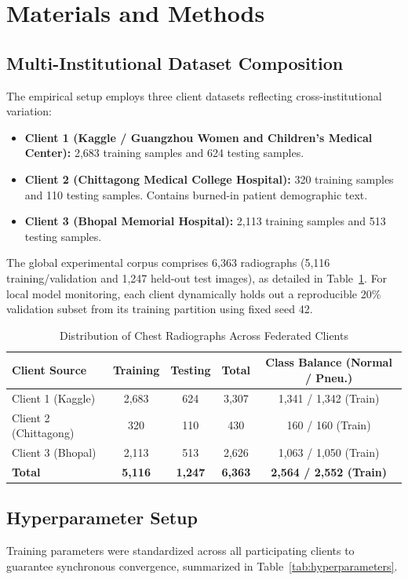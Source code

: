 \documentclass[journal]{IEEEtran}
\begin{document}
\section{Materials and Methods}

\subsection{Multi-Institutional Dataset Composition}
The empirical setup employs three client datasets reflecting cross-institutional variation:
\begin{itemize}
    \item \textbf{Client 1 (Kaggle / Guangzhou Women and Children's Medical Center):} 2,683 training samples and 624 testing samples.
    \item \textbf{Client 2 (Chittagong Medical College Hospital):} 320 training samples and 110 testing samples. Contains burned-in patient demographic text.
    \item \textbf{Client 3 (Bhopal Memorial Hospital):} 2,113 training samples and 513 testing samples.
\end{itemize}
The global experimental corpus comprises 6,363 radiographs (5,116 training/validation and 1,247 held-out test images), as detailed in Table~\ref{tab:dataset_distribution}. For local model monitoring, each client dynamically holds out a reproducible 20\% validation subset from its training partition using fixed seed 42.

\begin{table}[h]
\centering
\caption{Distribution of Chest Radiographs Across Federated Clients}
\label{tab:dataset_distribution}
\begin{tabular}{lcccc}
\toprule
\textbf{Client Source} & \textbf{Training} & \textbf{Testing} & \textbf{Total} & \textbf{Class Balance (Normal / Pneu.)} \\
\midrule
Client 1 (Kaggle)     & 2,683 & 624 & 3,307 & 1,341 / 1,342 (Train) \\
Client 2 (Chittagong) & 320   & 110 & 430   & 160 / 160 (Train) \\
Client 3 (Bhopal)     & 2,113 & 513 & 2,626 & 1,063 / 1,050 (Train) \\
\midrule
\textbf{Total}        & \textbf{5,116} & \textbf{1,247} & \textbf{6,363} & \textbf{2,564 / 2,552 (Train)} \\
\bottomrule
\end{tabular}
\end{table}

\subsection{Hyperparameter Setup}
Training parameters were standardized across all participating clients to guarantee synchronous convergence, summarized in Table~\ref{tab:hyperparameters}.
\end{document}
